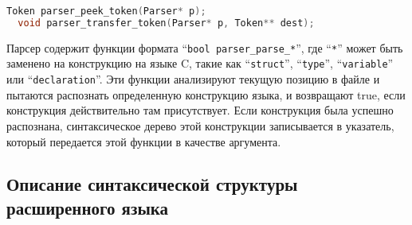 \begin{lstlisting}[language=c, caption={Вспомогательные функции парсера}, label={lst:parserutils}]
  Token parser_peek_token(Parser* p);
  void parser_transfer_token(Parser* p, Token** dest);
\end{lstlisting}

Парсер содержит функции формата ``\texttt{bool parser_parse_*}'', где ``\texttt{*}'' может быть заменено на конструкцию на языке C, такие как ``\texttt{struct}'', ``\texttt{type}'', ``\texttt{variable}'' или ``\texttt{declaration}''.
Эти функции анализируют текущую позицию в файле и пытаются распознать определенную конструкцию языка, и возвращают true, если конструкция действительно там присутствует. Если конструкция была успешно распознана, синтаксическое дерево этой конструкции записывается в указатель, который передается этой функции в качестве аргумента.

\subsection{Описание синтаксической структуры расширенного языка}



